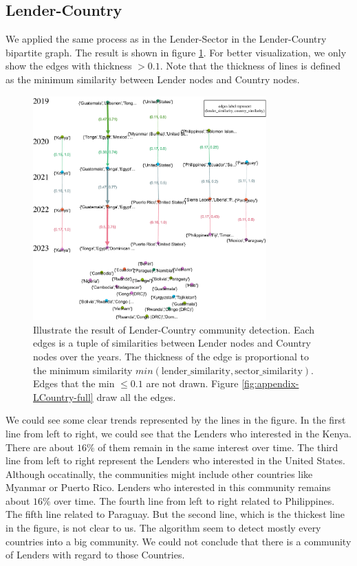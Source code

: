 \subsection{Lender-Country}

We applied the same process as in the Lender-Sector in the Lender-Country bipartite graph.
The result is shown in figure \ref{fig:LCountry}.
For better visualization, we only show the edges with thickness $> 0.1$.
Note that the thickness of lines is defined as the minimum similarity between Lender nodes and Country nodes.

\begin{figure}[H]
	\centering
	\includegraphics[width=0.8\textwidth]{images/LCountry.pdf}
	\caption[Illustrate the result of Lender-Country community detection]{
		Illustrate the result of Lender-Country community detection.
		Each edges is a tuple of similarities between Lender nodes and Country nodes over the years.
		The thickness of the edge is proportional to the minimum similarity $min(\text{lender\_similarity}, \text{sector\_similarity})$.
		Edges that the min $\le 0.1$ are not drawn.
		Figure \ref{fig:appendix-LCountry-full} draw all the edges.
	}
	\label{fig:LCountry}
\end{figure}

We could see some clear trends represented by the lines in the figure.
In the first line from left to right, we could see that the Lenders who interested in the Kenya.
There are about $16\%$ of them remain in the same interest over time.
The third line from left to right represent the Lenders who interested in the United States.
Although occatinally, the communities might include other countries like Myanmar or Puerto Rico.
Lenders who interested in this community remains about $16\%$ over time.
The fourth line from left to right related to Philippines.
The fifth line related to Paraguay.
But the second line, which is the thickest line in the figure, is not clear to us.
The algorithm seem to detect mostly every countries into a big community.
We could not conclude that there is a community of Lenders with regard to those Countries.


